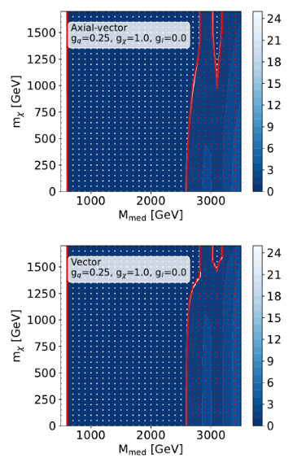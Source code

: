 \documentclass[a4paper, 11pt]{article}
\begin{document}
\begin{figure}[htp!]
  \begin{center}
  \begin{subfigure}[b]{0.49\textwidth}  
    \includegraphics[width=\textwidth]{figures/dix/CMS-EXO-16-056_A1_fromxsec.pdf}
    \caption{}
    \label{subfig:dijet_A1}
  \end{subfigure}
  \begin{subfigure}[b]{0.49\textwidth}  
    \includegraphics[width=\textwidth]{figures/dix/CMS-EXO-16-056_V1_fromxsec.pdf}
    \caption{}
    \label{subfig:dijet_V1}  
  \end{subfigure}

\end{center}
\end{figure}
\end{document}
